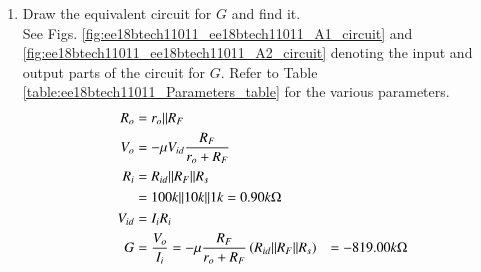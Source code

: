 \begin{enumerate}[label=\arabic*.,ref=\theenumi]
\begin{figure}[!ht]
\end{figure}
%
\item Draw the equivalent circuit for $G$ and find it.
\\
\solution See Figs. \ref{fig:ee18btech11011_ee18btech11011_A1_circuit} and \ref{fig:ee18btech11011_ee18btech11011_A2_circuit} denoting the input and output parts of the circuit for $G$. Refer to Table \ref{table:ee18btech11011_Parameters_table} for the various parameters.
%
\begin{align}
\label{ee18btech11011_R_o}
R_{o} &= r_{o}\|R_{F}\\
V_{o} &= -\mu V_{i d}\frac{R_{F}}{r_{o} + R_{F}}
\label{eq:ee18btech11011_V_o}
%
%
\\
R_{i} &= R_{i d}\|R_{F}\|R_{s}
\label{ee18btech11011_R_i}
\\
 &= 100k\|10k\|1k = 0.90k\ohm
\\
\label{eq:ee18btech11011_V_id}
V_{i d} &= I_{i}R_{i}
\\
G &= \frac{V_{o}}{I_{i}} = -\mu \frac{R_{F}}{r_{o} + R_{F}}\brak{R_{i d}\|R_{F}\|R_{s}}
\label{ee18btech11011_Open_loop_Gain}
&=  -819.00k\ohm
\end{align}


\end{enumerate}
